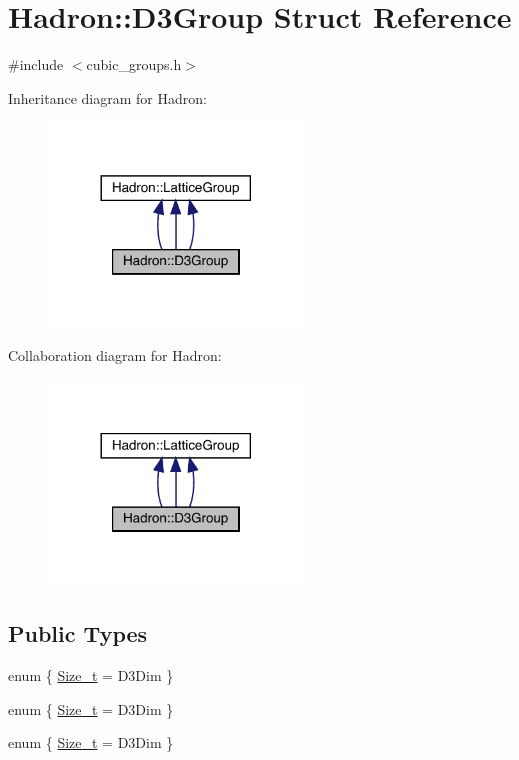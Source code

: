 \hypertarget{structHadron_1_1D3Group}{}\section{Hadron\+:\+:D3\+Group Struct Reference}
\label{structHadron_1_1D3Group}


{\ttfamily \#include $<$cubic\+\_\+groups.\+h$>$}



Inheritance diagram for Hadron\+:
\nopagebreak
\begin{figure}[H]
\begin{center}
\leavevmode
\includegraphics[width=192pt]{d3/d27/structHadron_1_1D3Group__inherit__graph}
\end{center}
\end{figure}


Collaboration diagram for Hadron\+:
\nopagebreak
\begin{figure}[H]
\begin{center}
\leavevmode
\includegraphics[width=192pt]{db/d1a/structHadron_1_1D3Group__coll__graph}
\end{center}
\end{figure}
\subsection*{Public Types}
\begin{DoxyCompactItemize}
\item 
enum \{ \mbox{\hyperlink{structHadron_1_1D3Group_a30bbb5590723d1c69ea1534a688379e5aa23dfbcefd441f0213ae42d08417ae76}{Size\+\_\+t}} = D3\+Dim
 \}
\item 
enum \{ \mbox{\hyperlink{structHadron_1_1D3Group_a30bbb5590723d1c69ea1534a688379e5aa23dfbcefd441f0213ae42d08417ae76}{Size\+\_\+t}} = D3\+Dim
 \}
\item 
enum \{ \mbox{\hyperlink{structHadron_1_1D3Group_a30bbb5590723d1c69ea1534a688379e5aa23dfbcefd441f0213ae42d08417ae76}{Size\+\_\+t}} = D3\+Dim
 \}
\end{DoxyCompactItemize}
